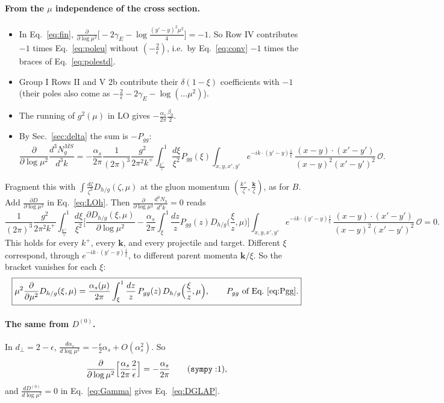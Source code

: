 \documentclass[10pt]{article}
\numberwithin{equation}{section}
\newcommand{\OO}{\mathcal O}
\newcommand{\preLO}{\frac{1}{(2\pi)^3}\frac{g^2}{2\pi^2k^+}}
\newcommand{\XX}{\frac{(x-y)\cdot(x'-y')}{(x-y)^{2}(x'-y')^{2}}}
\newcommand{\ph}{e^{-ik\cdot(y'-y)\frac{1}{\xi}}}
\begin{document}
\paragraph{From the $\mu$ independence of the cross section.}
\begin{itemize}
\item In Eq.~\eqref{eq:fin}, $\frac{\partial}{\partial\log\mu^2}\big[-2\gamma_E-\log\frac{(y'-y)^2\mu^2}{4}\big]=-1$. So Row IV contributes $-1$ times Eq.~\eqref{eq:poleu} without $(-\frac{2}{\epsilon})$, i.e.\ by Eq.~\eqref{eq:conv} $-1$ times the braces of Eq.~\eqref{eq:polestd}.
\item Group I Rows II and V 2b contribute their $\delta(1-\xi)$ coefficients with $-1$ (their poles also come as $-\frac2\epsilon-2\gamma_E-\log(\dots\mu^2)$).
\item The running of $g^2(\mu)$ in LO gives $-\frac{\alpha_s}{2\pi}\frac{\beta_0}{2}$.
\item By Sec.~\ref{sec:delta} the sum is $-P_{gg}$:
\begin{equation*}
\frac{\partial}{\partial\log\mu^2}\frac{d^3N^{\overline{MS}}_g}{d^3k}=-\frac{\alpha_s}{2\pi}\preLO\int_{\frac{k^+}{\vee}}^1\frac{d\xi}{\xi^2}P_{gg}(\xi)\int_{x,y,x',y'}\ph\,\XX\,\OO .
\end{equation*}
\end{itemize}
Fragment this with $\int\frac{d\zeta}{\zeta^3}D_{h/g}(\zeta,\mu)$ at the gluon momentum $(\frac{k^+}{\zeta},\frac{\mathbf k}{\zeta})$, as for $B$. Add $\frac{\partial D}{\partial\log\mu^2}$ in Eq.~\eqref{eq:LOh}. Then $\frac{\partial}{\partial\log\mu^2}\frac{d^3N_h}{d^3k}=0$ reads
\begin{equation}
\preLO\int_{\frac{k^+}{\vee}}^1\frac{d\xi}{\xi^2}\Big[\frac{\partial D_{h/g}(\xi,\mu)}{\partial\log\mu^2}-\frac{\alpha_s}{2\pi}\int_\xi^1\frac{dz}{z}P_{gg}(z)D_{h/g}\Big(\frac{\xi}{z},\mu\Big)\Big]\int_{x,y,x',y'}\ph\,\XX\,\OO=0 .
\end{equation}
This holds for every $k^+$, every $\mathbf k$, and every projectile and target. Different $\xi$ correspond, through $\ph$, to different parent momenta $\mathbf k/\xi$. So the bracket vanishes for each $\xi$:
\begin{equation}
\boxed{\mu^2\frac{\partial}{\partial\mu^2}D_{h/g}(\xi,\mu)=\frac{\alpha_s(\mu)}{2\pi}\int_\xi^1\frac{dz}{z}\,P_{gg}(z)\,D_{h/g}\Big(\frac{\xi}{z},\mu\Big),\qquad P_{gg}\ \text{of Eq.~\eqref{eq:Pgg}}.}
\label{eq:DGLAP}
\end{equation}

\paragraph{The same from $D^{(0)}$.} In $d_\perp=2-\epsilon$, $\frac{d\alpha_s}{d\log\mu^2}=-\frac{\epsilon}{2}\alpha_s+O(\alpha_s^2)$. So
\begin{equation*}
\frac{\partial}{\partial\log\mu^2}\Big[\frac{\alpha_s}{2\pi}\frac{2}{\epsilon}\Big]=-\frac{\alpha_s}{2\pi}\qquad(\texttt{sympy}: $1$),
\end{equation*}
and $\frac{dD^{(0)}}{d\log\mu^2}=0$ in Eq.~\eqref{eq:Gamma} gives Eq.~\eqref{eq:DGLAP}.
\end{document}
